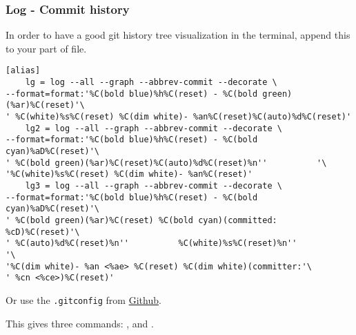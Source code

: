 \subsubsection{Log - Commit history}

In order to have a good git history tree visualization in the terminal, append this to your \code{[alias]} part of  file.

\begin{verbatim}
[alias]
    lg = log --all --graph --abbrev-commit --decorate \
--format=format:'%C(bold blue)%h%C(reset) - %C(bold green)(%ar)%C(reset)'\
' %C(white)%s%C(reset) %C(dim white)- %an%C(reset)%C(auto)%d%C(reset)'
    lg2 = log --all --graph --abbrev-commit --decorate \
--format=format:'%C(bold blue)%h%C(reset) - %C(bold cyan)%aD%C(reset)'\
' %C(bold green)(%ar)%C(reset)%C(auto)%d%C(reset)%n''          '\
'%C(white)%s%C(reset) %C(dim white)- %an%C(reset)'
    lg3 = log --all --graph --abbrev-commit --decorate \
--format=format:'%C(bold blue)%h%C(reset) - %C(bold cyan)%aD%C(reset)'\
' %C(bold green)(%ar)%C(reset) %C(bold cyan)(committed: %cD)%C(reset)'\
' %C(auto)%d%C(reset)%n''          %C(white)%s%C(reset)%n''          '\
'%C(dim white)- %an <%ae> %C(reset) %C(dim white)(committer:'\
' %cn <%ce>)%C(reset)'
\end{verbatim}

Or use the \texttt{.gitconfig} from \href{https://github.com/robinhellmers/computer_setup/blob/master/git_setup/gitconfig}{Github}.

This gives three commands: ,  and .